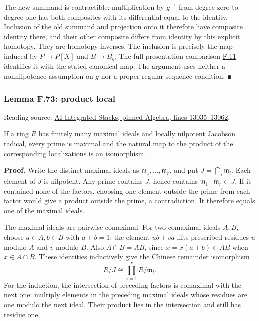 \documentclass[11pt,a4paper,openany]{report}
\newcounter{none}
\begin{document}
The new summand is contractible: multiplication by \(g^{-1}\) from degree zero to degree one has both composites with its differential equal to the identity. Inclusion of the old summand and projection onto it therefore have composite identity there, and their other composite differs from identity by this explicit homotopy. They are homotopy inverses. The inclusion is precisely the map induced by \(P\to P[X]\) and \(B\to B_g\). The full presentation comparison \hyperref[AG-RG-S05-algebra-lemma-NL-homotopy]{F.11} identifies it with the stated canonical map. The argument uses neither a nonnilpotence assumption on \(g\) nor a proper regular-sequence condition. ∎

\label{AG-RG-S05-algebra-lemma-product-local}

\subsubsection{Lemma F.73: product local}\label{AG-RG-S05-lemma-f.73-product-local}

Reading source: \href{https://github.com/KokunoYumeto/unofficial-stacks-project-ai-drafts/blob/565b10e987aba5969b21145a0833f42d69f96790/algebra.tex\#L13035-L13062}{AI Integrated Stacks, pinned Algebra, lines 13035--13062}.

If a ring \(R\) has finitely many maximal ideals and locally nilpotent Jacobson radical, every prime is maximal and the natural map to the product of the corresponding localizations is an isomorphism.

\textbf{Proof.} Write the distinct maximal ideals as \(\mathfrak m_1,\ldots,\mathfrak m_r\), and put \(J=\bigcap_i\mathfrak m_i\). Each element of \(J\) is nilpotent. Any prime contains \(J\), hence contains \(\mathfrak m_1\cdots\mathfrak m_r\subset J\). If it contained none of the factors, choosing one element outside the prime from each factor would give a product outside the prime, a contradiction. It therefore equals one of the maximal ideals.

The maximal ideals are pairwise comaximal. For two comaximal ideals \(A,B\), choose \(a\in A,b\in B\) with \(a+b=1\); the element \(ub+va\) lifts prescribed residues \(u\) modulo \(A\) and \(v\) modulo \(B\). Also \(A\cap B=AB\), since \(x=x(a+b)\in AB\) when \(x\in A\cap B\). These identities inductively give the Chinese remainder isomorphism \[R/J\cong\prod_{i=1}^r R/\mathfrak m_i.\] For the induction, the intersection of preceding factors is comaximal with the next one: multiply elements in the preceding maximal ideals whose residues are one modulo the next ideal. Their product lies in the intersection and still has residue one.
\end{document}
